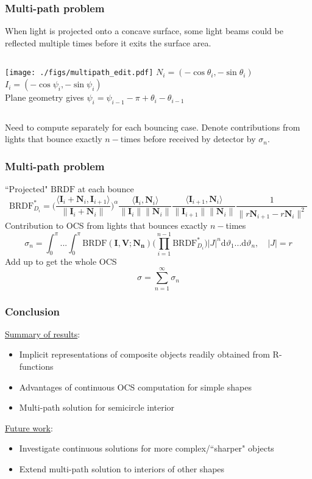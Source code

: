 \documentclass{beamer}
\newcommand{\BRDF}{\mathrm{BRDF}}
\newcommand{\ip}[2]{\langle {#1}, {#2} \rangle}
\begin{document}
\begin{frame}[t]
\frametitle{Multi-path problem}
When light is projected onto a concave surface, some light beams could be reflected multiple times before it exits the surface area. 
\begin{columns}
 \texttt{[image: ./figs/multipath\_edit.pdf]}
 $N_i=(-\cos \theta_i,-\sin\theta_i)$\\ $I_i=(-\cos \psi_i,-\sin\psi_i)$\\ Plane geometry gives $\psi_{i}=\psi_{i-1}-\pi+\theta_i-\theta_{i-1}$
\end{columns}
Need to compute separately for each bouncing case. Denote contributions from lights that bounce exactly $n-$times before received by detector by $\sigma_n$.
\end{frame}

\begin{frame}[t]
\frametitle{Multi-path problem}
``Projected" $\BRDF$ at each bounce
$$\BRDF^*_{D_i}=\Bigg(\frac{\ip{\mathbf{I}_i+\mathbf{N}_i}{\mathbf{I}_{i+1}}}{\|\mathbf{I}_i+\mathbf{N}_i\|}\Bigg)^\alpha\frac{\ip{\mathbf{I}_i}{\mathbf{N}_i}}{\|\mathbf{I}_i\|\|\mathbf{N}_i\|}\frac{\ip{\mathbf{I}_{i+1}}{\mathbf{N}_i}}{\|\mathbf{I}_{i+1}\|\|\mathbf{N}_i\|} \frac{1}{\|r\mathbf{N}_{i+1}-r\mathbf{N}_i\|^2}$$
Contribution to OCS from lights that bounces exactly $n-$times 
\begin{equation*}
\sigma_n =\int_{0}^{\pi}...\int_{0}^{\pi}\BRDF(\mathbf{I},\mathbf{V};\mathbf{N_n})\bigg(\prod_{i=1}^{n-1}\BRDF^*_{D_i}\bigg) |J|^n\mathrm{d}\vartheta_1...\mathrm{d}\vartheta_n , \quad |J|=r
\end{equation*}
Add up to get the whole OCS
$$\sigma=\sum_{n=1}^{\infty} \sigma_n$$
\end{frame}

\begin{frame}[t]
\frametitle{Conclusion}
\underline{Summary of results}:
\begin{itemize}
\item Implicit representations of composite objects readily obtained from R-functions 
\item Advantages of continuous OCS computation for simple shapes
\item Multi-path solution for semicircle interior
\end{itemize}
\underline{Future work}:
\begin{itemize}
\item Investigate continuous solutions for more complex/``sharper" objects 
\item Extend multi-path solution to interiors of other shapes
\end{itemize}
\end{frame}
\end{document}
